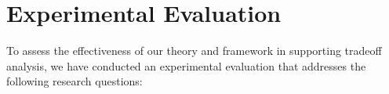 \documentclass{sig-alternate}
\begin{document}

\section{Experimental Evaluation}
\label{evaluation}



To assess the effectiveness of our theory and framework in supporting tradeoff analysis, we have conducted an experimental evaluation that addresses the following research questions:

\end{document}
